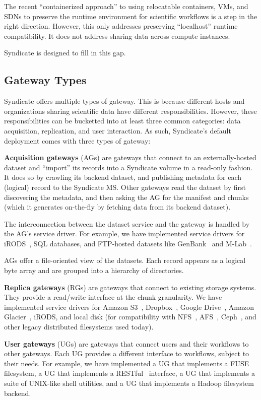 The recent ``containerized approach'' to using relocatable containers, VMs, and
SDNs to preserve the runtime environment for scientific workflows
is a step in the right direction.  However, this only addresses preserving
``localhost'' runtime compatibility.  It does not address sharing data across
compute instances.

Syndicate is designed to fill in this gap.

\subsection{Gateway Types}

Syndicate offers multiple types of gateway.  This is because
different hosts and organizations sharing scientific data have different
responsibilities.  However, these responsibilities can be bucketted into 
at least three common categories:  data acquisition, replication, and user interaction.
As such, Syndicate's default deployment comes with three types of gateway:

\textbf{Acquisition gateways} (AGs) are gateways that connect to an externally-hosted
dataset and ``import'' its records into a Syndicate volume in a read-only
fashion.  It does so by crawling its backend dataset, and publishing metadata
for each (logical) record to the Syndicate MS.  Other gateways read the dataset
by first discovering the metadata, and then asking the AG for the manifest and
chunks (which it generates on-the-fly by fetching data from its backend
dataset).

The interconnection between the dataset service and the gateway is
handled by the AG's service driver.  For example, we have implemented service
drivers for iRODS~\cite{irods}, SQL databases, and FTP-hosted datasets like
GenBank~\cite{genbank} and M-Lab~\cite{mlab}.

AGs offer a file-oriented view of the datasets.  Each record appears as a
logical byte array and are grouped into a hierarchy of directories.

\textbf{Replica gateways} (RGs) are gateways that connect to existing storage
systems.  They provide a read/write interface at the chunk granularity.  We have
implemented service drivers for Amazon S3~\cite{s3}, Dropbox~\cite{dropbox},
Google Drive~\cite{google-drive}, Amazon Glacier~\cite{amazon-glacier}, iRODS,
and local disk (for compatibility with NFS~\cite{nfs}, AFS~\cite{afs},
Ceph~\cite{ceph}, and other legacy distributed filesystems used today).

\textbf{User gateways} (UGs) are gateways that connect users and their workflows
to other gateways.  Each UG provides a different interface to workflows, subject
to their needs.  For example, we have implemented a UG that implements a
FUSE~\cite{fuse} filesystem, a UG that implements a RESTful~\cite{rest}
interface, a UG that implements a suite of UNIX-like shell utilities, and a UG
that implements a Hadoop filesystem~\cite{hadoop} backend.

